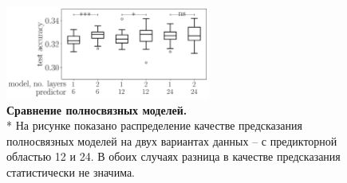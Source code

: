 \begin{figure}[H] %
	\centering
	\includegraphics[width = 0.6\textwidth]{pics/dnn_models_all_runs_p1_ecoli_100000_10000_12_0.png}
	\caption{{\bfseries Сравнение полносвязных моделей.} \\* 
		На рисунке показано распределение качестве предсказания полносвязных моделей на двух вариантах данных -- с предикторной областью 12 и 24. В обоих случаях разница в качестве предсказания статистически не значима. \\
		   \mannwhitni }
	\label{fig:dnn_test}	
\end{figure}